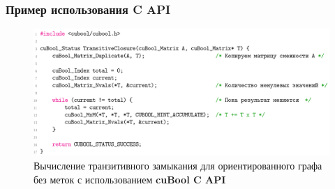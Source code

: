 \documentclass[aspectratio=169,xcolor=table,english]{beamer}
\begin{document}

\begin{frame}[fragile] \frametitle{Пример использования C API}
    \begin{center} 
    \begin{minipage}[m]{0.9\linewidth}
        \begin{figure}
            \centering
            \includegraphics[width=\textwidth]{figures/tc_c_api.png}
            \caption{Вычисление транзитивного замыкания для ориентированного графа без меток с использованием \textbf{cuBool C API}}
        \end{figure}
    \end{minipage}\hfill    
    \end{center}   
\end{frame}
\end{document}
